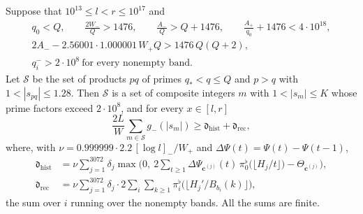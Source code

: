 \documentclass[11pt,colorlinks]{charlie}
\newcommand{\cS}{\mathcal S}
\begin{document}
\begin{proposition}\label{prop:semiprimes}
Suppose that $10^{13}\le l<r\le10^{17}$ and
\begin{equation}\label{eq:semi-cond}
\begin{gathered}
 q_0<Q,\qquad \frac{2W_-}Q>1476,\qquad \frac{A_-}Q>Q+1476,\qquad \frac{A_+}{q_0}+1476<4\cdot10^{18},\\
 2A_--2.56001\cdot1.000001\,W_+Q>1476\,Q(Q+2),\\
 q_i^->2\cdot10^8\ \text{for every nonempty band}.
\end{gathered}
\end{equation}
Let $\cS$ be the set of products $pq$ of primes $q_*<q\le Q$ and $p>q$ with $1<|s_{pq}|\le1.28$. Then $\cS$ is a set of composite integers $m$ with $1<|s_m|\le K$ whose prime factors exceed $2\cdot10^8$, and for every $x\in[l,r]$
\[
 \frac{2L}W\sum_{m\in\cS}g_-(|s_m|)\ge\mathfrak d_{\mathrm{hist}}+\mathfrak d_{\mathrm{rec}},
\]
where, with $\nu=0.999999\cdot2.2\,[\log l]_-/W_+$ and $\Delta\Psi(t)=\Psi(t)-\Psi(t-1)$,
\begin{align*}
 \mathfrak d_{\mathrm{hist}}&=\nu\sum_{j=1}^{3072}\delta_j\max\Big(0,\ 2\sum_{t\ge1}\Delta\Psi_{\mathbf c^{(j)}}(t)\,\pi_0^\flat\big(\lfloor H_j/t\rfloor\big)-\Theta_{\mathbf c^{(j)}}\Big),\\
 \mathfrak d_{\mathrm{rec}}&=\nu\sum_{j=1}^{3072}\delta_j\cdot2\sum_{i}\sum_{k\ge1}\pi_i^\flat\big(\lfloor H_j'/B_{b_i}(k)\rfloor\big),
\end{align*}
the sum over $i$ running over the nonempty bands. All the sums are finite.
\end{proposition}
\end{document}
